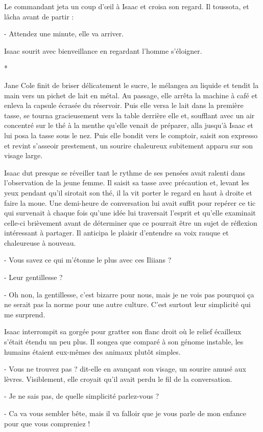 \documentclass[12pt]{book}
\newcommand{\s}{\begin{center}
*
\end{center}
}
\begin{document}
Le commandant jeta un coup d’œil à Isaac et croisa son regard. Il toussota, et lâcha avant de partir :


-  Attendez une minute, elle va arriver.


Isaac sourit avec bienveillance en regardant l’homme s’éloigner.


\s


Jane Cole finit de briser délicatement le sucre, le mélangea au liquide et tendit la main vers un pichet de lait en métal. Au passage, elle arrêta la machine à café et enleva la capsule écrasée du réservoir. Puis elle versa le lait dans la première tasse, se tourna gracieusement vers la table derrière elle et, soufflant avec un air concentré sur le thé à la menthe qu’elle venait de préparer, alla jusqu’à Isaac et lui posa la tasse sous le nez. Puis elle bondit vers le comptoir, saisit son expresso et revint s’asseoir prestement, un sourire chaleureux subitement apparu sur son visage large.


Isaac dut presque se réveiller tant le rythme de ses pensées avait ralenti dans l’observation de la jeune femme. Il saisit sa tasse avec précaution et, levant les yeux pendant qu’il sirotait son thé, il la vit porter le regard en haut à droite et faire la moue. Une demi-heure de conversation lui avait suffit pour repérer ce tic qui survenait à chaque fois qu’une idée lui traversait l’esprit et qu’elle examinait celle-ci brièvement avant de déterminer que ce pourrait être un sujet de réflexion intéressant à partager. Il anticipa le plaisir d’entendre sa voix rauque et chaleureuse à nouveau.


-  Vous savez ce qui m’étonne le plus avec ces Iliians ?

-  Leur gentillesse ?

-   Oh non, la gentillesse, c'est bizarre pour nous, mais je ne vois pas pourquoi ça ne serait pas la norme pour une autre culture. C’est surtout leur simplicité qui me surprend.


Isaac interrompit sa gorgée pour gratter son flanc droit où le relief écailleux s’était étendu un peu plus. Il songea que comparé à son génome instable, les humains étaient eux-mêmes des animaux plutôt simples.


-   Vous ne trouvez pas ? dit-elle en avançant son visage, un sourire amusé aux lèvres. Visiblement, elle croyait qu’il avait perdu le fil de la conversation.

-   Je ne sais pas, de quelle simplicité parlez-vous ?

-  Ca va vous sembler bête, mais il va falloir que je vous parle de mon enfance pour que vous compreniez !
\end{document}
